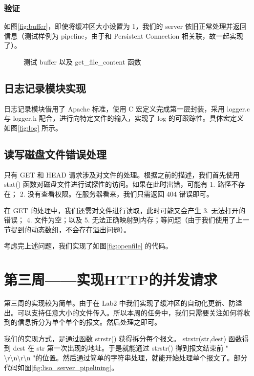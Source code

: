 \subsubsection*{验证}
如图\ref{fig:buffer}，即使将缓冲区大小设置为 1，我们的 server 依旧正常处理并返回信息（测试样例为 pipeline，由于和 Persistent Connection 相关联，故一起实现了）。
\begin{figure}[htbp!]
    \centering
    \subfigure[buffer\_test,BUF\_SIZE=1]{\label{fig:buffer}\texttt{[image: BUF=1.png]}}
    \caption{测试 buffer 以及 get\_file\_content 函数}\label{fig:Chapter2.2}
\end{figure}

\subsection{日志记录模块实现}
日志记录模块借用了 Apache 标准，使用 C 宏定义完成第一层封装，采用 logger.c 与 logger.h 配合，进行向特定文件的输入，实现了 log 的可跟踪性。具体宏定义如图\ref{fig:log} 所示。

\subsection{读写磁盘文件错误处理}
只有 GET 和 HEAD 请求涉及对文件的处理。根据之前的描述，我们首先使用 stat() 函数对磁盘文件进行试探性的访问。如果在此时出错，可能有 1. 路径不存在； 2. 没有查看权限。在服务器看来，我们只需返回 404 错误即可。

在 GET 的处理中，我们还需对文件进行读取，此时可能又会产生 3. 无法打开的错误； 4. 文件为空；以及 5. 无法正确映射到内存；等问题（由于我们使用了上一节提到的动态数组，不会存在溢出问题）。

考虑完上述问题，我们实现了如图\ref{fig:openfile} 的代码。

\section{第三周——实现HTTP的并发请求}

第三周的实现较为简单。由于在 Lab2 中我们实现了缓冲区的自动化更新、防溢出。可以支持任意大小的文件传入。所以本周的任务中，我们只需要关注如何将收到的信息拆分为单个单个的报文。然后处理之即可。

我们的实现方式，是通过函数 strstr() 获得拆分每个报文。 strstr(str,dest) 函数得到 dest 在 str 第一次出现的地址。于是就能通过 strstr() 得到报文结束前 " \textbackslash r\textbackslash n\textbackslash r\textbackslash n "的位置。然后通过简单的字符串处理，就能开始处理单个报文了。部分代码如图\ref{fig:liso_server_pipelining}。

